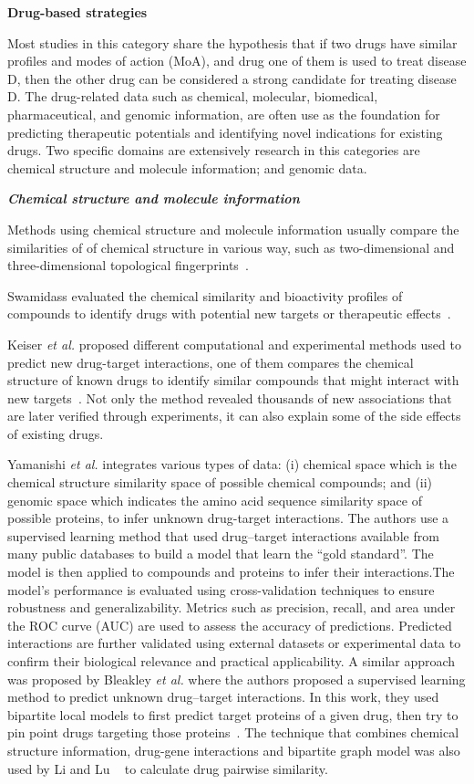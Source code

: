 \textbf{Drug-based strategies}

Most studies in this category share the hypothesis that if two drugs have similar profiles and modes of action (MoA), and drug one of them is used to treat disease D, then the other drug can be considered a strong candidate for treating disease D. The drug-related data such as chemical, molecular, biomedical, pharmaceutical, and genomic information, are often use as the foundation for predicting therapeutic potentials and identifying novel indications for existing drugs. Two specific domains are extensively research in this categories are chemical structure and molecule information; and genomic data.

\textit{\textbf{Chemical structure and molecule information}}

Methods using chemical structure and molecule information usually compare the similarities of of chemical structure in various way, such as two-dimensional and three-dimensional topological fingerprints~\cite{rognan2007chemogenomic, pihan2012drug3d, novick2013sweetlead}.

Swamidass evaluated the chemical similarity and bioactivity profiles of compounds to identify drugs with potential new targets or therapeutic effects~\cite{swamidass2011mining}. 

Keiser \textit{et  al.}  proposed different computational and experimental methods used to predict new drug-target interactions, one of them compares the chemical structure of known drugs to identify similar compounds that might interact with new targets~\cite{keiser2009predicting}.  Not only the method revealed thousands of new associations that are later verified through experiments, it can also explain some of the side effects of existing drugs.

Yamanishi \textit{et  al.} integrates various types of data: (i) chemical space which is the chemical structure similarity space of possible chemical compounds; and (ii) genomic space which indicates the amino acid sequence similarity space of possible proteins, to infer unknown drug-target interactions. The authors use a supervised learning method that used  drug–target interactions available from many public databases to build a model that learn the ``gold standard''. The model is then applied to compounds and proteins to infer their interactions.The model’s performance is evaluated using cross-validation techniques to ensure robustness and generalizability. Metrics such as precision, recall, and area under the ROC curve (AUC) are used to assess the accuracy of predictions. Predicted interactions are further validated using external datasets or experimental data to confirm their biological relevance and practical applicability.
A similar approach was proposed by Bleakley \textit{et al.} where the authors proposed a supervised learning method to predict unknown drug–target interactions. In this work, they used bipartite local models to first predict target proteins of a given drug, then try to pin point drugs targeting those proteins~\cite{bleakley2009supervised}.
The technique that combines chemical structure information, drug-gene interactions and bipartite graph model was also used by Li and Lu ~\cite{li2012new} to calculate drug pairwise similarity.

